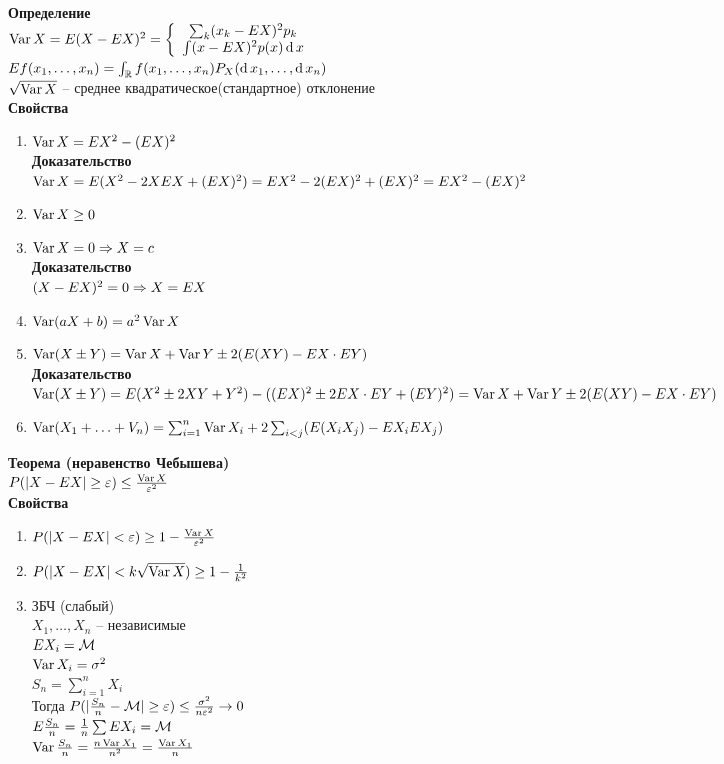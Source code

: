 \documentclass[12pt]{article}
\begin{document}
\textbf{Определение}\\
$\operatorname{Var} X = E(X-EX)^2 = \left\{\begin{array}{c}
    \sum_k (x_k-EX)^2p_k\\
    \int (x-EX)^2 p(x)\operatorname{d} x
\end{array}\right.$\\
$Ef(x_1, \ldots, x_n) = \int_\mathbb{R} f(x_1, \ldots, x_n)P_X(\operatorname{d} x_1, \ldots, \operatorname{d} x_n)$\\
$\sqrt{\operatorname{Var} X}$ -- среднее квадратическое(стандартное) отклонение\\
\textbf{Свойства}
\begin{enumerate}
    \item $\operatorname{Var} X = EX^2 - (EX)^2$\\
    \textbf{Доказательство}\\
    $\operatorname{Var} X = E(X^2 - 2XEX + (EX)^2) = EX^2 - 2(EX)^2 + (EX)^2 = EX^2 - (EX)^2$
    \item $\operatorname{Var} X \geq 0$
    \item $\operatorname{Var} X = 0\Rightarrow X = c$\\
    \textbf{Доказательство}\\
    $(X-EX)^2 = 0 \Rightarrow X = EX$
    \item $\operatorname{Var} (aX + b) = a^2 \operatorname{Var} X$
    \item $\operatorname{Var} (X\pm Y) = \operatorname{Var} X + \operatorname{Var} Y \pm 2(E(XY) - EX\cdot EY)$\\
    \textbf{Доказательство}\\
    $\operatorname{Var}(X\pm Y) = E(X^2\pm 2XY + Y^2) - ((EX)^2 \pm 2EX\cdot EY + (EY)^2) = \operatorname{Var} X + \operatorname{Var} Y \pm 2(E(XY)-EX\cdot EY)$
    \item $\operatorname{Var} (X_1 + \ldots + V_n) = \sum_{i=1}^n \operatorname{Var} X_i + 2\sum_{i < j} (E(X_iX_j) - EX_iEX_j)$
\end{enumerate}
\textbf{Теорема (неравенство Чебышева)}\\
$P(|X-EX|\geq \varepsilon) \leq \frac{\operatorname{Var} X}{\varepsilon^2}$\\
\textbf{Свойства}
\begin{enumerate}
    \item $P(|X-EX| < \varepsilon) \geq 1 - \frac{\operatorname{Var} X}{\varepsilon^2}$
    \item $P(|X-EX| < k\sqrt{\operatorname{Var} X}) \geq 1 - \frac1{k^2}$
    \item ЗБЧ (слабый)\\
    $X_1,\ldots, X_n$ -- независимые\\
    $EX_i = \mathcal M$\\
    $\operatorname{Var} X_i = \sigma^2$\\
    $S_n = \sum_{i=1}^n X_i$\\
    Тогда $P(|\frac{S_n}{n} - \mathcal M| \geq \varepsilon) \leq \frac{\sigma^2}{n\varepsilon^2} \rightarrow 0$\\
    $E \frac{S_n}{n} = \frac1n \sum EX_i = \mathcal M$\\
    $\operatorname{Var} \frac{S_n}{n} = \frac{n \operatorname{Var} X_1}{n^2} = \frac{\operatorname{Var} X_1}{n}$
\end{enumerate}
\end{document}
